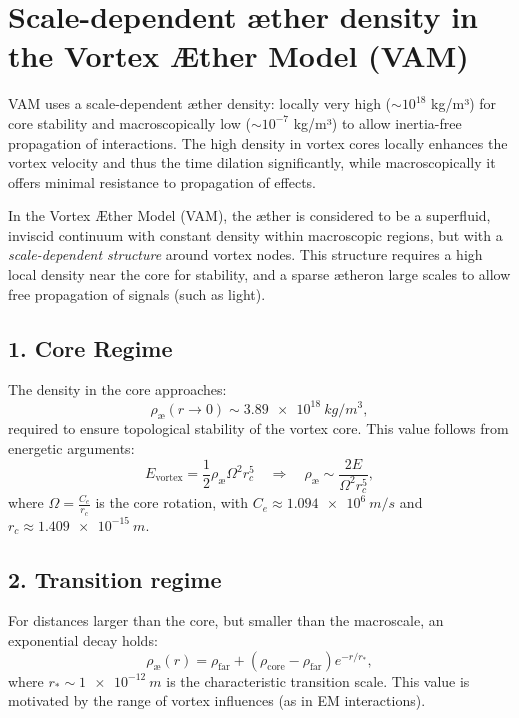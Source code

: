 
\section*{Scale-dependent æther density in the Vortex Æther Model (VAM)}

VAM uses a scale-dependent æther density: locally very high ($\sim10^{18}$ kg/m³) for core stability and macroscopically low ($\sim10^{-7}$ kg/m³) to allow inertia-free propagation of interactions. The high density in vortex cores locally enhances the vortex velocity and thus the time dilation significantly, while macroscopically it offers minimal resistance to propagation of effects.


In the Vortex Æther Model (VAM), the æther is considered to be a superfluid, inviscid continuum with constant density within macroscopic regions, but with a \emph{scale-dependent structure} around vortex nodes. This structure requires a high local density near the core for stability, and a sparse ætheron large scales to allow free propagation of signals (such as light).

\subsection*{1. Core Regime}

The density in the core approaches:
\begin{equation}
    \rho_\text{\ae}(r \to 0) \sim \SI{3.89e18}{kg/m^3},
\end{equation}
required to ensure topological stability of the vortex core. This value follows from energetic arguments:
\begin{equation}
    E_{\text{vortex}} = \frac{1}{2} \rho_\text{\ae} \Omega^2 r_c^5 \quad\Rightarrow\quad \rho_\text{\ae} \sim \frac{2 E}{\Omega^2 r_c^5},
\end{equation}
where \( \Omega = \frac{C_e}{r_c} \) is the core rotation, with \( C_e \approx \SI{1.094e6}{m/s} \) and \( r_c \approx \SI{1.409e-15}{m} \).

\subsection*{2. Transition regime}

For distances larger than the core, but smaller than the macroscale, an exponential decay holds:
\begin{equation}
    \rho_\text{\ae}(r) = \rho_\text{far} + (\rho_\text{core} - \rho_\text{far}) e^{-r/r_*},
\end{equation}
where \( r_* \sim \SI{1e-12}{m} \) is the characteristic transition scale. This value is motivated by the range of vortex influences (as in EM interactions).


